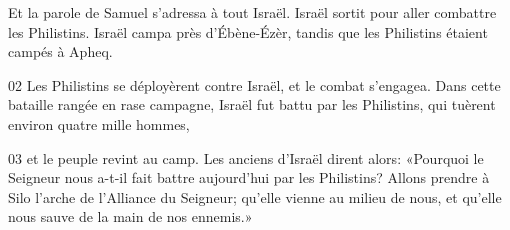 Et la parole de Samuel s’adressa à tout Israël. Israël sortit pour aller combattre les Philistins. Israël campa près d’Ébène-Ézèr, tandis que les Philistins étaient campés à Apheq.

02 Les Philistins se déployèrent contre Israël, et le combat s’engagea. Dans cette bataille rangée en rase campagne, Israël fut battu par les Philistins, qui tuèrent environ quatre mille hommes,

03 et le peuple revint au camp. Les anciens d’Israël dirent alors: «Pourquoi le Seigneur nous a-t-il fait battre aujourd’hui par les Philistins? Allons prendre à Silo l’arche de l’Alliance du Seigneur; qu’elle vienne au milieu de nous, et qu’elle nous sauve de la main de nos ennemis.»

